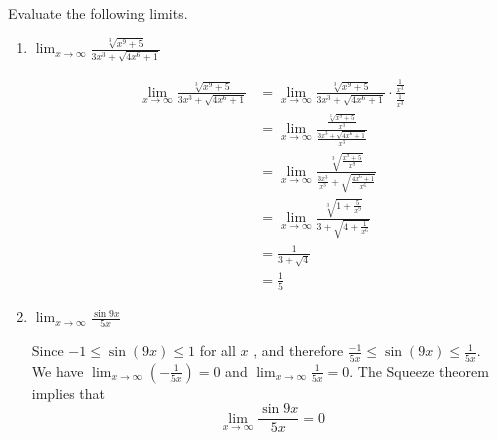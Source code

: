 \documentclass[nooutcomes]{ximera}
\begin{document}
\begin{problem}
Evaluate the following limits.
	\begin{enumerate}
		\item $\lim_{x \to \infty} \frac{\sqrt[3]{x^9+5}}{3x^3+ \sqrt{4x^6+1}}$
		\begin{freeResponse}
		\begin{align*}
		\lim_{x \to \infty} \frac{\sqrt[3]{x^9+5}}{3x^3+ \sqrt{4x^6+1}}
		&=\lim_{x \to \infty} \frac{\sqrt[3]{x^9+5}}{3x^3+ \sqrt{4x^6+1}}\cdot \frac{\frac{1}{x^3}}{\frac{1}{x^3}}\\
		&=\lim_{x \to \infty} \frac{\frac{\sqrt[3]{x^9+5}}{x^3}}{\frac{3x^3+ \sqrt{4x^6+1}}{x^3}}\\
		&=\lim_{x \to \infty}  \frac{\sqrt[3]{\frac{x^9+5}{x^9}}}{\frac{3x^3}{x^3}+ \sqrt{\frac{4x^6+1}{x^6}}}\\
		&=\lim_{x \to \infty}  \frac{\sqrt[3]{1+\frac{5}{x^9}}}{3+ \sqrt{4+\frac{1}{x^6}}}\\
		&=\frac{1}{3+ \sqrt{4}}\\
		&=\frac{1}{5}
		\end{align*}
		\end{freeResponse}

		\item $\lim_{x \to \infty} \frac{\sin{9x}}{5x}$
		\begin{freeResponse}
		 Since $-1 \le  \sin(9x) \le 1$ for all $x$ , and therefore $\frac{-1}{5x} \le  \sin(9x) \le \frac{1}{5x}$.\\
		  We have $\lim_{x \to \infty} \left(-\frac{1}{5x} \right) = 0$ and $\lim_{x \to \infty} \frac{1}{5x} = 0$.  The Squeeze theorem implies that
        \[
          \lim_{x \to \infty} \frac{\sin{9x}}{5x} = 0
        \]
		\end{freeResponse}
	\end{enumerate}
\end{problem}
\end{document}
